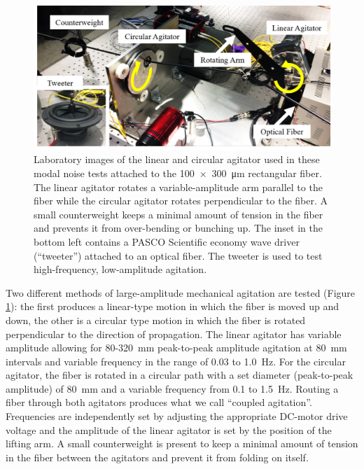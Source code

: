 \documentclass[twocolumn]{emulateapj}
\begin{document}
\begin{figure}
\centering
	\includegraphics[width=\columnwidth]{images/agitators_labelled.pdf}
	\caption{Laboratory images of the linear and circular agitator used in these modal noise tests attached to the \SI{100x300}{\micro\meter} rectangular fiber. The linear agitator rotates a variable-amplitude arm parallel to the fiber while the circular agitator rotates perpendicular to the fiber. A small counterweight keeps a minimal amount of tension in the fiber and prevents it from over-bending or bunching up. The inset in the bottom left contains a PASCO Scientific economy wave driver (``tweeter'') attached to an optical fiber. The tweeter is used to test high-frequency, low-amplitude agitation.}
\label{fig:agitators}
\end{figure}

Two different methods of large-amplitude mechanical agitation are tested (Figure \ref{fig:agitators}): the first produces a linear-type motion in which the fiber is moved up and down, the other is a circular type motion in which the fiber is rotated perpendicular to the direction of propagation. The linear agitator has variable amplitude allowing for 80-\SI{320}{\milli\meter} peak-to-peak amplitude agitation at \SI{80}{\milli\meter} intervals and variable frequency in the range of 0.03 to \SI{1.0}{\hertz}. For the circular agitator, the fiber is rotated in a circular path with a set diameter (peak-to-peak amplitude) of \SI{80}{\milli\meter} and a variable frequency from 0.1 to \SI{1.5}{\hertz}. Routing a fiber through both agitators produces what we call ``coupled agitation''.  Frequencies are independently set by adjusting the appropriate DC-motor drive voltage and the amplitude of the linear agitator is set by the position of the lifting arm. A small counterweight is present to keep a minimal amount of tension in the fiber between the agitators and prevent it from folding on itself.
\end{document}
